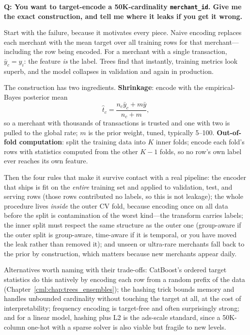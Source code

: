\begin{interviewq}
\textbf{Q: You want to target-encode a 50K-cardinality \texttt{merchant\_id}. Give me the exact construction, and tell me where it leaks if you get it wrong.}

 \quad {} \quad \badgefreq{\freqhigh}

\stronganswer

Start with the failure, because it motivates every piece. Naive encoding replaces each merchant with the mean target over all training rows for that merchant---including the row being encoded. For a merchant with a single transaction, $\bar y_c = y_i$: the feature \emph{is} the label. Trees find that instantly, training metrics look superb, and the model collapses in validation and again in production.

The construction has two ingredients. \textbf{Shrinkage}: encode with the empirical-Bayes posterior mean
\begin{equation*}
\hat t_c = \frac{n_c \bar y_c + m \bar y}{n_c + m},
\end{equation*}
so a merchant with thousands of transactions is trusted and one with two is pulled to the global rate; $m$ is the prior weight, tuned, typically 5--100. \textbf{Out-of-fold computation}: split the training data into $K$ inner folds; encode each fold's rows with statistics computed from the other $K-1$ folds, so no row's own label ever reaches its own feature.

Then the four rules that make it survive contact with a real pipeline: the encoder that ships is fit on the \emph{entire} training set and applied to validation, test, and serving rows (those rows contributed no labels, so this is not leakage); the whole procedure lives \emph{inside} the outer CV fold, because encoding once on all data before the split is contamination of the worst kind---the transform carries labels; the inner split must respect the same structure as the outer one (group-aware if the outer split is group-aware, time-aware if it is temporal, or you have moved the leak rather than removed it); and unseen or ultra-rare merchants fall back to the prior by construction, which matters because new merchants appear daily.

Alternatives worth naming with their trade-offs: CatBoost's ordered target statistics do this natively by encoding each row from a random prefix of the data (Chapter~\ref{cml:chap:trees_ensembles}); the hashing trick bounds memory and handles unbounded cardinality without touching the target at all, at the cost of interpretability; frequency encoding is target-free and often surprisingly strong; and for a linear model, hashing plus L2 is the ads-scale standard, since a 50K-column one-hot with a sparse solver is also viable but fragile to new levels.


\end{interviewq}
